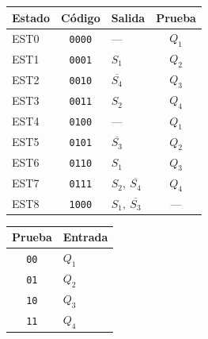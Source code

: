 \noindent
\begin{minipage}[t]{0.56\textwidth}
\label{tab:estados}
\centering\small
\begin{tabular}{@{}l c l c@{}}
\toprule
\textbf{Estado} & \textbf{Código} & \textbf{Salida} & \textbf{Prueba} \\
\midrule
EST0 & \texttt{0000} & ---                     & $Q_1$ \\
EST1 & \texttt{0001} & $S_1$                   & $Q_2$ \\
EST2 & \texttt{0010} & $\overline{S_4}$        & $Q_3$ \\
EST3 & \texttt{0011} & $S_2$                   & $Q_4$ \\
EST4 & \texttt{0100} & ---                     & $Q_1$ \\
EST5 & \texttt{0101} & $\overline{S_3}$        & $Q_2$ \\
EST6 & \texttt{0110} & $S_1$                   & $Q_3$ \\
EST7 & \texttt{0111} & $S_2,\ \overline{S_4}$  & $Q_4$ \\
EST8 & \texttt{1000} & $S_1,\ \overline{S_3}$  & ---   \\
\bottomrule
\end{tabular}
\end{minipage}\hfill
\begin{minipage}[t]{0.40\textwidth}
\label{tab:entradas}
\centering\small
\begin{tabular}{@{}c l@{}}
\toprule
\textbf{Prueba} & \textbf{Entrada} \\
\midrule
\texttt{00} & $Q_1$ \\
\texttt{01} & $Q_2$ \\
\texttt{10} & $Q_3$ \\
\texttt{11} & $Q_4$ \\
\bottomrule
\end{tabular}
\end{minipage}

\vspace{0.6cm}


